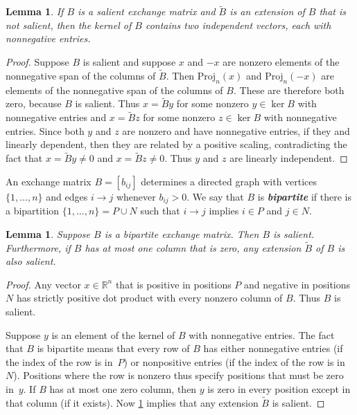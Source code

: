 \documentclass{amsart}
\newtheorem{lemma}[proposition]{Lemma}
\theoremstyle{definition}
\theoremstyle{remark}
\numberwithin{equation}{section}
\newcommand{\newword}[1]{\textbf{\emph{#1}}}
\newcommand{\reals}{\mathbb R}
\newcommand{\set}[1]{{\lbrace #1 \rbrace}}
\newcommand{\0}{{\mathbf{0}}}
\newcommand{\Proj}{\mathrm{Proj}}
\newcommand{\tB}{{\tilde{B}}}
\begin{document}
\begin{lemma}\label{extend salient}
If $B$ is a salient exchange matrix and $\tB$ is an extension of $B$ that is not salient, then the kernel of $B$ contains two independent vectors, each with nonnegative entries.
\end{lemma}
\begin{proof}
Suppose $B$ is salient and suppose $x$ and $-x$ are nonzero elements of the nonnegative span of the columns of $\tB$.
Then $\Proj_n(x)$ and $\Proj_n(-x)$ are elements of the nonnegative span of the columns of $B$.
These are therefore both zero, because $B$ is salient.
Thus $x=\tB y$ for some nonzero $y\in\ker B$ with nonnegative entries and $x=\tB z$ for some nonzero $z\in\ker B$ with nonnegative entries.
Since both $y$ and $z$ are nonzero and have nonnegative entries, if they and linearly dependent, then they are related by a positive scaling, contradicting the fact that $x=\tB y\neq0$ and $x=\tB z\neq0$.
Thus $y$ and $z$ are linearly independent.
\end{proof}

An exchange matrix $B=[b_{ij}]$ determines a directed graph with vertices $\set{1,\ldots,n}$ and edges $i\to j$ whenever $b_{ij}>0$.
We say that $B$ is \newword{bipartite} if there is a bipartition $\set{1,\ldots,n}=P\cup N$ such that $i\to j$ implies $i\in P$ and $j\in N$.

\begin{lemma}\label{bip sal}
Suppose $B$ is a bipartite exchange matrix.
Then $B$ is salient.
Furthermore, if $B$ has at most one column that is zero, any extension $\tB$ of $B$ is also salient.
\end{lemma}
\begin{proof}
Any vector $x\in\reals^n$ that is positive in positions $P$ and negative in positions $N$ has strictly positive dot product with every nonzero column of $B$.
Thus $B$ is salient.

Suppose $y$ is an element of the kernel of $B$ with nonnegative entries.
The fact that $B$ is bipartite means that every row of $B$ has either nonnegative entries (if the index of the row is in~$P$) or nonpositive entries (if the index of the row is in~$N$).
Positions where the row is nonzero thus specify positions that must be zero in~$y$.
If $B$ has at most one zero column, then $y$ is zero in every position except in that column (if it exists).
Now \cref{extend salient} implies that any extension $\tB$ is salient.
\end{proof}
\end{document}
